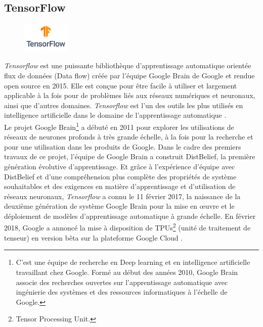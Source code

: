\subsection{TensorFlow}\label{defTensor}
\begin{figure}
    \includegraphics[width=0.2\textwidth]{img/tensorlogo.png}
\end{figure}
\textit{Tensorflow} est une puissante bibliothèque d’apprentissage automatique orientée flux de données (Data flow) créée par l'équipe Google Brain de Google et rendue open source en 2015. Elle est conçue pour être facile à utiliser et largement applicable à la fois pour de problèmes liés aux réseaux numériques et neuronaux, ainsi que d'autres domaines. \textit{Tensorflow} est l'un des outils les plus utilisés en intelligence artificielle dans le domaine de l'apprentissage automatique \citep{wiki:xxx}.\\

Le projet Google Brain\footnote{C'est une équipe de recherche en Deep learning et en intelligence artificielle travaillant chez Google. Formé au début des années 2010, Google Brain associe des recherches ouvertes sur l'apprentissage automatique avec ingénierie des systèmes et des ressources informatiques à l'échelle de Google.} a débuté en 2011 pour explorer les utilisations de réseaux de neurones profonds à très grande échelle, à la fois pour la recherche et pour une utilisation dans les produits de Google. Dans le cadre des premiers travaux de ce projet, l'équipe de Google Brain a construit DistBelief, la première génération évolutive d'apprentissage. Et grâce à l'expérience d'équipe avec DistBelief et d'une compréhension plus complète des propriétés de système souhaitables et des exigences en matière d'apprentissage et d'utilisation de réseaux neuronaux, \textit{Tensorflow} a connu le 11 février 2017, la naissance de la deuxième génération de système Google Brain pour la mise en œuvre et le déploiement de modèles d'apprentissage automatique à grande échelle. En février 2018, Google a annoncé la mise à disposition de TPUs\footnote{Tensor Processing Unit.} (unité de traitement de tenseur) en version bêta sur la plateforme Google Cloud \citep{girija2016tensorflow}.\\


